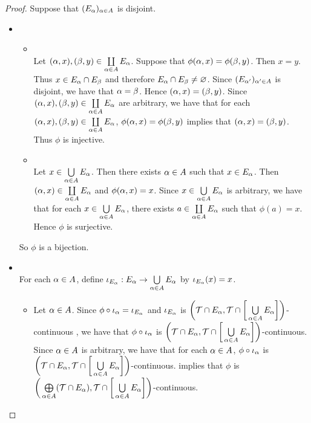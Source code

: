 \documentclass{book}
\begin{document}
	\begin{proof} 
		Suppose that $(E_{\alpha})_{\alpha \in A}$ is disjoint. 
		\begin{itemize}
			\item {} \\
			\begin{itemize}
				\item {} \\
				Let $(\alpha, x), (\beta, y) \in \coprod\limits_{\alpha \in A} E_{\alpha}$. Suppose that $\phi(\alpha, x) =  \phi(\beta, y)$. Then $x = y$. Thus $x \in E_{\alpha} \cap E_{\beta}$ and therefore $E_{\alpha} \cap E_{\beta} \neq \varnothing$. Since $(E_{\alpha'})_{\alpha' \in A}$ is disjoint, we have that $\alpha = \beta$. Hence $(\alpha, x) = (\beta, y)$. Since $(\alpha, x), (\beta, y) \in \coprod\limits_{\alpha \in A} E_{\alpha}$ are arbitrary, we have that for each $(\alpha, x), (\beta, y) \in \coprod\limits_{\alpha \in A} E_{\alpha}$, $\phi(\alpha, x) =  \phi(\beta, y)$ implies that $(\alpha, x) = (\beta, y)$. Thus $\phi$ is injective. 
				\item {} \\
				Let $x \in \bigcup\limits_{\alpha \in A} E_{\alpha}$. Then there exists $\alpha \in A$ such that $x \in E_{\alpha}$. Then $(\alpha, x) \in \coprod\limits_{\alpha \in A} E_{\alpha}$ and $\phi(\alpha, x) = x$. Since $x \in \bigcup\limits_{\alpha \in A} E_{\alpha}$ is arbitrary, we have that for each $x \in \bigcup\limits_{\alpha \in A} E_{\alpha}$, there exists $a \in \coprod\limits_{\alpha \in A} E_{\alpha}$ such that $\phi(a) = x$. Hence $\phi$ is surjective.
			\end{itemize}
			So $\phi$ is a bijection.
			\item {} \\
			For each $\alpha \in A$, define $\iota_{E_{\alpha}}: E_{\alpha} \rightarrow \bigcup\limits_{\alpha \in A} E_{\alpha}$ by $\iota_{E_{\alpha}}(x) = x$.
			\begin{itemize}
				\item Let $\alpha \in A$. Since $\phi \circ \iota_{\alpha} = \iota_{E_{\alpha}}$ and $\iota_{E_{\alpha}}$ is $\bigg( \mathcal{T} \cap E_{\alpha}, \mathcal{T} \cap \bigg[ \bigcup\limits_{\alpha \in A} E_{\alpha} \bigg] \bigg)$-continuous , we have that $\phi \circ \iota_{\alpha}$ is $\bigg( \mathcal{T} \cap E_{\alpha}, \mathcal{T} \cap \bigg[ \bigcup\limits_{\alpha \in A} E_{\alpha} \bigg] \bigg)$-continuous. Since $\alpha \in A$ is arbitrary, we have that for each $\alpha \in A$, $\phi \circ \iota_{\alpha}$ is $\bigg( \mathcal{T} \cap E_{\alpha}, \mathcal{T} \cap \bigg[ \bigcup\limits_{\alpha \in A} E_{\alpha} \bigg] \bigg)$-continuous.  implies that $\phi$ is $\bigg( \bigoplus\limits_{\alpha \in A} (\mathcal{T} \cap E_{\alpha}), \mathcal{T} \cap \bigg[ \bigcup\limits_{\alpha \in A} E_{\alpha} \bigg] \bigg)$-continuous. 

\end{itemize}
\end{itemize}
\end{proof}
\end{document}
